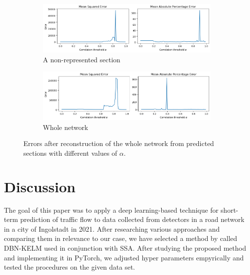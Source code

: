 \begin{figure}
	\begin{subfigure}{\textwidth}
		\includegraphics[width=\textwidth,keepaspectratio]{img/alpha_prediction_one.png}
		\caption{A non-represented section}
		\label{fig:alpha_prediction_one}
	\end{subfigure}
	\begin{subfigure}{\textwidth}
		\includegraphics[width=\textwidth,keepaspectratio]{img/alpha_prediction_all.png}
		\caption{Whole network}
		\label{fig:alpha_prediction_all}
	\end{subfigure}
	\centering
	\caption{Errors after reconstruction of the whole network from predicted sections with different values of $\alpha$.}
	\label{fig:alpha_prediction}
\end{figure}


\chapter{Discussion}

The goal of this paper was to apply a deep learning-based technique for
short-term prediction of traffic flow to data collected from detectors in a road
network in a city of Ingolstadt in 2021. After researching various approaches
and comparing them in relevance to our case, we have selected a method by
\citet{Han.2020} called DBN-KELM used in conjunction with SSA. After studying
the proposed method and implementing it in PyTorch, we adjusted hyper parameters
empyrically and tested the procedures on the given data set.

